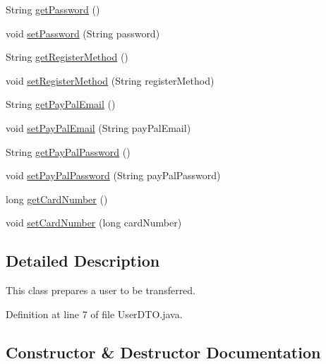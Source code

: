 \begin{DoxyCompactItemize}
String \mbox{\hyperlink{class_s_p_q_1_1dto_1_1_user_d_t_o_a955f436e60336683283a6fcd6fc5f874}{get\+Password}} ()
\item 
void \mbox{\hyperlink{class_s_p_q_1_1dto_1_1_user_d_t_o_a35bd2d50e194e3d923e8adcf229e5a3e}{set\+Password}} (String password)
\item 
String \mbox{\hyperlink{class_s_p_q_1_1dto_1_1_user_d_t_o_ab2180112e27f967d77dd4696f88bd2ef}{get\+Register\+Method}} ()
\item 
void \mbox{\hyperlink{class_s_p_q_1_1dto_1_1_user_d_t_o_a8e4fb216f49f13c196598119a15556ea}{set\+Register\+Method}} (String register\+Method)
\item 
String \mbox{\hyperlink{class_s_p_q_1_1dto_1_1_user_d_t_o_a42f2eecae334e6e937419b1c201cb1f2}{get\+Pay\+Pal\+Email}} ()
\item 
void \mbox{\hyperlink{class_s_p_q_1_1dto_1_1_user_d_t_o_ab166e73261db557f7fce5a47adf955f0}{set\+Pay\+Pal\+Email}} (String pay\+Pal\+Email)
\item 
String \mbox{\hyperlink{class_s_p_q_1_1dto_1_1_user_d_t_o_ab024e5157674f9bc382edfda06c348ec}{get\+Pay\+Pal\+Password}} ()
\item 
void \mbox{\hyperlink{class_s_p_q_1_1dto_1_1_user_d_t_o_afe549d85cf389f5f7aa90eb8a0f1a6d8}{set\+Pay\+Pal\+Password}} (String pay\+Pal\+Password)
\item 
long \mbox{\hyperlink{class_s_p_q_1_1dto_1_1_user_d_t_o_a6ffd8dce998a3e1756aa82e7b2981dd4}{get\+Card\+Number}} ()
\item 
void \mbox{\hyperlink{class_s_p_q_1_1dto_1_1_user_d_t_o_a9f35044d63cd9769575a5ec019dc9cca}{set\+Card\+Number}} (long card\+Number)
\end{DoxyCompactItemize}


\subsection{Detailed Description}
This class prepares a user to be transferred. 

Definition at line 7 of file User\+D\+T\+O.\+java.



\subsection{Constructor \& Destructor Documentation}
\mbox{\label{class_s_p_q_1_1dto_1_1_user_d_t_o_a40cad7b1dea2117ed4cb0e69fdc6b929}} 
